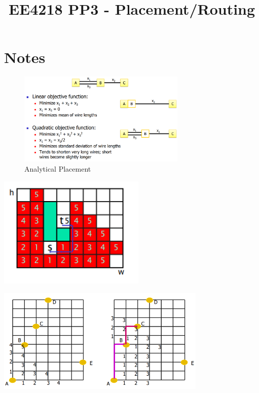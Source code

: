 \documentclass{article}
\title{\vspace{-2cm} EE4218 PP3 - Placement/Routing}
\date{\vspace{-5ex}}
\begin{document}
\maketitle

\section{Notes}
\begin{figure}[htp]
    \centering
    \includegraphics[width=8cm, scale=1]{analyticalPlacement.PNG}
    \caption{Analytical Placement}
\end{figure}

\begin{minipage}[t]{0.5\textwidth}
    \centering
    \includegraphics[width=7cm, scale=1]{mazeRouting1.PNG}
\end{minipage}%
\begin{minipage}[t]{0.5\textwidth}
    \centering
    \includegraphics[width=10cm, scale=1]{mazeRouting2.PNG}
\end{minipage}%
\end{document}
